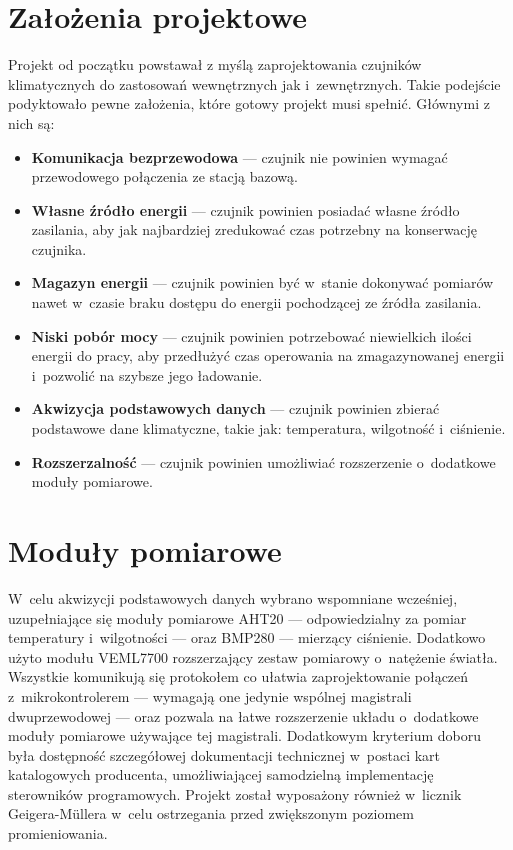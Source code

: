 \section{Założenia projektowe}
Projekt od początku powstawał z myślą zaprojektowania czujników klimatycznych 
do zastosowań wewnętrznych jak i~zewnętrznych. Takie podejście podyktowało 
pewne założenia, które gotowy projekt musi spełnić. Głównymi z nich są:
\begin{itemize}
    \item \textbf{Komunikacja bezprzewodowa} --- czujnik nie powinien 
    wymagać przewodowego połączenia ze stacją bazową.
    \item \textbf{Własne źródło energii} --- czujnik powinien
    posiadać własne źródło zasilania, aby jak najbardziej zredukować czas
    potrzebny na konserwację czujnika.
    \item \textbf{Magazyn energii} --- czujnik powinien być 
    w~stanie dokonywać pomiarów nawet w~czasie braku dostępu do energii 
    pochodzącej ze źródła zasilania.
    \item \textbf{Niski pobór mocy} --- czujnik powinien potrzebować niewielkich
    ilości energii do pracy, aby przedłużyć czas operowania na zmagazynowanej
    energii i~pozwolić na szybsze jego ładowanie.
    \item \textbf{Akwizycja podstawowych danych} --- czujnik powinien zbierać
    podstawowe dane klimatyczne, takie jak: temperatura, wilgotność i~ciśnienie.
    \item \textbf{Rozszerzalność} --- czujnik powinien umożliwiać rozszerzenie
    o~dodatkowe moduły pomiarowe.
\end{itemize} 


\section{Moduły pomiarowe}
\label{section:measurement_modules}
W~celu akwizycji podstawowych danych wybrano wspomniane wcześniej, 
uzupełniające się moduły pomiarowe AHT20 --- odpowiedzialny za 
pomiar temperatury i~wilgotności --- oraz BMP280 --- mierzący ciśnienie.
Dodatkowo użyto modułu VEML7700 rozszerzający zestaw pomiarowy 
o~natężenie światła. 
Wszystkie komunikują się protokołem \isqrc{} co ułatwia zaprojektowanie
połączeń z~mikrokontrolerem --- wymagają one jedynie wspólnej magistrali 
dwuprzewodowej --- oraz pozwala na łatwe rozszerzenie układu o~dodatkowe
moduły pomiarowe używające tej magistrali.
Dodatkowym kryterium doboru była dostępność 
szczegółowej dokumentacji technicznej w~postaci kart katalogowych 
producenta, umożliwiającej samodzielną implementację sterowników 
programowych.
Projekt został wyposażony również w~licznik Geigera-Müllera w~celu
ostrzegania przed zwiększonym poziomem promieniowania.

